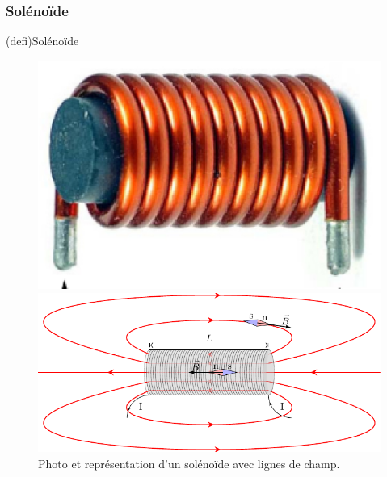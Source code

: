 \documentclass[../../main/main.tex]{subfiles}
\begin{document}
\subsubsection{Solénoïde}
\label{sssec:solen}
\begin{tcb*}(defi){Solénoïde}
	\begin{center}
	\end{center}
\end{tcb*}

\begin{figure}[h]
	\noindent
	\begin{minipage}[c]{.20\linewidth}
		\includegraphics[scale=1]{sol_phot.jpg}
	\end{minipage}
	\hfill
	\begin{minipage}[c]{.70\linewidth}
		\includegraphics[width=\linewidth]{sol_chp}
	\end{minipage}
	\caption{Photo et représentation d'un solénoïde avec lignes de champ.}
	\label{fig:sol1}
\end{figure}
\end{document}
